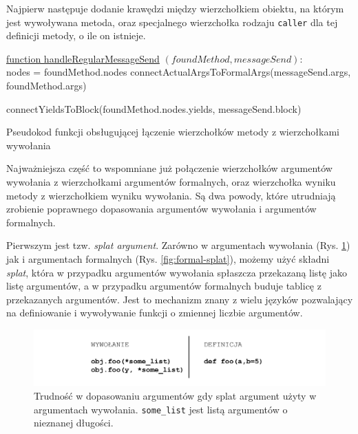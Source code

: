 \documentclass[declaration,shortabstract,mgr]{iithesis}
\newcommand{\algsize}{\small}
\begin{document}
Najpierw następuje dodanie krawędzi między wierzchołkiem obiektu, na którym jest wywoływana metoda, oraz specjalnego wierzchołka rodzaju \texttt{caller} dla tej definicji metody, o ile on istnieje.

\begin{algorithm}
    \algsize
    \underline{function handleRegularMessageSend} $(\mathit{foundMethod}, \mathit{messageSend})$:\\
    nodes = foundMethod.nodes\;
    connectActualArgsToFormalArgs(messageSend.args, foundMethod.args)\;

    connectYieldsToBlock(foundMethod.nodes.yields, messageSend.block)\;
    \caption{Pseudokod funkcji obsługującej łączenie wierzchołków metody z wierzchołkami wywołania}
    \label{alg:handleRegularMessageSend}
\end{algorithm}

Najważniejsza część to wspomniane już połączenie wierzchołków argumentów wywołania z wierzchołkami argumentów formalnych, oraz wierzchołka wyniku metody z wierzchołkiem wyniku wywołania. Są dwa powody, które utrudniają zrobienie poprawnego dopasowania argumentów wywołania i argumentów formalnych.

Pierwszym jest tzw. \textit{splat argument}. Zarówno w argumentach wywołania (Rys. \ref{fig:actual-splat}) jak i argumentach formalnych (Rys. \ref{fig:formal-splat}), możemy użyć składni \emph{splat}, która w przypadku argumentów wywołania spłaszcza przekazaną listę jako listę argumentów, a w przypadku argumentów formalnych buduje tablicę z przekazanych argumentów. Jest to mechanizm znany z wielu języków pozwalający na definiowanie i wywoływanie funkcji o zmiennej liczbie argumentów.

\begin{figure}[htb]
	\centering
	\includegraphics[scale=0.6]{imgs/splat.png}
	\caption{Trudność w dopasowaniu argumentów gdy splat argument użyty w argumentach wywołania. 	\texttt{some\_list} jest listą argumentów o nieznanej długości.}
	\label{fig:actual-splat}
\end{figure}
\end{document}
